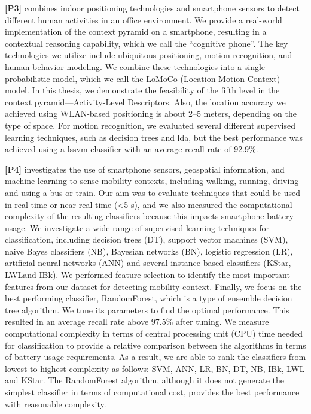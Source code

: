 \textbf{[P3]} combines indoor positioning technologies and smartphone sensors to detect different human activities in an office environment. We provide a real-world implementation of the context pyramid on a smartphone, resulting in a contextual reasoning capability, which we call the ``cognitive phone''. The key technologies we utilize include ubiquitous positioning, motion recognition, and human behavior modeling. We combine these technologies into a single probabilistic model, which we call the LoMoCo (Location-Motion-Context) model. In this thesis, we demonstrate the feasibility of the fifth level in the context pyramid---Activity-Level Descriptors. Also, the location accuracy we achieved using WLAN-based positioning is about 2--5 meters, depending on the type of space. For motion recognition, we evaluated several different supervised learning techniques, such as decision trees and \gls{lda}, but the best performance was achieved using a \gls{lssvm} classifier with an average recall rate of 92.9\%.

\textbf{[P4]} investigates the use of smartphone sensors, geospatial information, and machine learning to sense mobility contexts, including walking, running, driving and using a bus or train. Our aim was to evaluate techniques that could be used  in real-time or  near-real-time (<5 s), and we also measured the computational complexity of the resulting classifiers because this impacts smartphone battery usage. We investigate a wide range of supervised learning techniques for
classification, including decision trees (DT), support vector machines (SVM), naive Bayes classifiers (NB), Bayesian networks (BN), logistic regression (LR), artificial neural networks (ANN) and several instance-based classifiers (KStar, LWLand IBk). We performed feature selection to identify the most important features from our dataset for detecting mobility context. Finally, we focus on the best performing classifier, RandomForest, which is a type of ensemble decision tree algorithm. We tune its parameters to find the optimal performance. This resulted in an average recall rate above 97.5\% after tuning. We measure computational complexity in terms of central processing unit (CPU) time needed for classification to provide a relative comparison between the algorithms in terms of battery usage requirements. As a result, we are able to rank the classifiers from lowest to highest complexity as follows: SVM, ANN, LR, BN, DT, NB, IBk, LWL and KStar. The RandomForest algorithm, although it does not generate the simplest classifier in terms of computational cost, provides the best performance with reasonable complexity.

